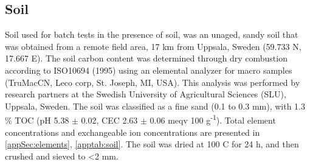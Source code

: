 \begin{table}
    \caption{Spike concentrations (SC) in \textmu g L\textsuperscript{-1} used for the batch tests, corrected for the analytical standards. MIX = cocktail spike concentration for biochar-water batch tests in triplicates, MIX-S = cocktail spike concentration for biochar-soil-water and soil-water batch tests.}
    \label{tab:spikeConcentrations}
\end{table} 

\subsection{Soil}
Soil used for batch tests in the presence of soil, was an unaged, sandy soil that was obtained from a remote field area, 17 km from Uppsala, Sweden (59.733 N, 17.667 E). The soil carbon content was determined through dry combustion according to ISO10694 (1995) using an elemental analyzer for macro samples (TruMac\textregistered CN, Leco corp, St. Joseph, MI, USA). This analysis was performed by research partners at the Swedish University of Agricultural Sciences (SLU), Uppsala, Sweden. The soil was classified as a fine sand (0.1 to 0.3 mm), with 1.3 \% TOC (pH 5.38 $\pm$ 0.02, CEC 2.63 $\pm$ 0.06 meqv 100 g\textsuperscript{-1}). Total element concentrations and exchangeable ion concentrations are presented in \cref{appSec:elements}, \cref{apptab:soil}. The soil was dried at 100 \textdegree C for 24 h, and then crushed and sieved to \textless 2 mm. 

